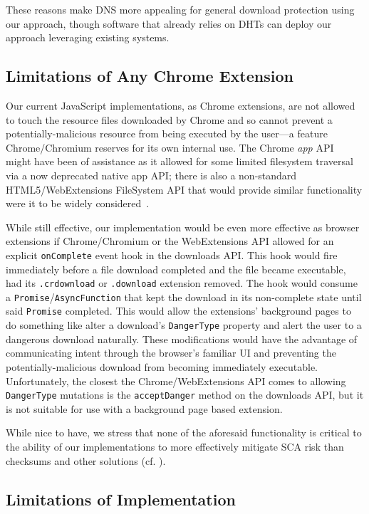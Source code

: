 These reasons make DNS more appealing for general download protection using our
approach, though software that already relies on DHTs can deploy our approach
leveraging existing systems.

\subsection{Limitations of Any Chrome Extension}

Our current JavaScript implementations, as Chrome extensions, are not allowed to
touch the resource files downloaded by Chrome and so cannot prevent a
potentially-malicious resource from being executed by the user---a feature
Chrome/Chromium reserves for its own internal use. The Chrome \textit{app}
API~\cite{AppAPI} might have been of assistance as it allowed for some limited
filesystem traversal via a now deprecated native app API; there is also a
non-standard HTML5/WebExtensions FileSystem API that would provide similar
functionality were it to be widely considered~\cite{deadSpec}.

While still effective, our implementation would be even more effective as
browser extensions if Chrome/Chromium or the WebExtensions API allowed for an
explicit \texttt{onComplete} event hook in the downloads API. This hook would
fire immediately before a file download completed and the file became
executable, \ie had its \texttt{.crdownload} or \texttt{.download} extension
removed. The hook would consume a \texttt{Promise}/\texttt{AsyncFunction} that
kept the download in its non-complete state until said \texttt{Promise}
completed. This would allow the extensions' background pages to do something
like alter a download's \texttt{DangerType} property and alert the user to a
dangerous download naturally. These modifications would have the advantage of
communicating intent through the browser's familiar UI and preventing the
potentially-malicious download from becoming immediately executable.
Unfortunately, the closest the Chrome/WebExtensions API comes to allowing
\texttt{DangerType} mutations is the \texttt{acceptDanger} method on the
downloads API, but it is not suitable for use with a background page based
extension.

While nice to have, we stress that none of the aforesaid functionality is
critical to the ability of our implementations to more effectively mitigate SCA
risk than checksums and other solutions (cf. ).




\subsection{Limitations of Implementation}
